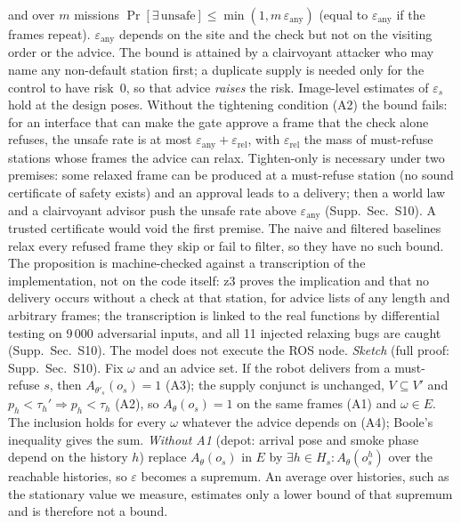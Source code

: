 \documentclass[conference]{IEEEtran}
\newcommand{\tauh}{\tau_{h}}
\begin{document}
and over $m$ missions $\Pr[\exists\,\text{unsafe}]\le\min(1,m\,\varepsilon_{\mathrm{any}})$ (equal to $\varepsilon_{\mathrm{any}}$ if the frames repeat). $\varepsilon_{\mathrm{any}}$ depends on the site and the check but not on the visiting order or the advice. The bound is attained by a clairvoyant attacker who may name any non-default station first; a duplicate supply is needed only for the control to have risk~0, so that advice \emph{raises} the risk. Image-level estimates of $\varepsilon_s$ hold at the design poses. Without the tightening condition (A2) the bound fails: for an interface that can make the gate approve a frame that the check alone refuses, the unsafe rate is at most $\varepsilon_{\mathrm{any}}+\varepsilon_{\mathrm{rel}}$, with $\varepsilon_{\mathrm{rel}}$ the mass of must-refuse stations whose frames the advice can relax. Tighten-only is necessary under two premises: some relaxed frame can be produced at a must-refuse station (no sound certificate of safety exists) and an approval leads to a delivery; then a world law and a clairvoyant advisor push the unsafe rate above $\varepsilon_{\mathrm{any}}$ (Supp.~Sec.~S10). A trusted certificate would void the first premise. The naive and filtered baselines relax every refused frame they skip or fail to filter, so they have no such bound. The proposition is machine-checked against a transcription of the implementation, not on the code itself: z3 proves the implication and that no delivery occurs without a check at that station, for advice lists of any length and arbitrary frames; the transcription is linked to the real functions by differential testing on 9\,000 adversarial inputs, and all 11 injected relaxing bugs are caught (Supp.~Sec.~S10). The model does not execute the ROS node.
\emph{Sketch} (full proof: Supp.~Sec.~S10). Fix $\omega$ and an advice set. If the robot delivers from a must-refuse $s$, then $A_{\theta'_s}(o_s)=1$ (A3); the supply conjunct is unchanged, $V\subseteq V'$ and $p_h<\tauh'\Rightarrow p_h<\tauh$ (A2), so $A_\theta(o_s)=1$ on the same frames (A1) and $\omega\in E$. The inclusion holds for every $\omega$ whatever the advice depends on (A4); Boole's inequality gives the sum.
\emph{Without A1} (depot: arrival pose and smoke phase depend on the history $h$) replace $A_\theta(o_s)$ in $E$ by $\exists h\in H_s:A_\theta(o^h_s)$ over the reachable histories, so $\varepsilon$ becomes a supremum. An average over histories, such as the stationary value we measure, estimates only a lower bound of that supremum and is therefore not a bound.
\end{document}
